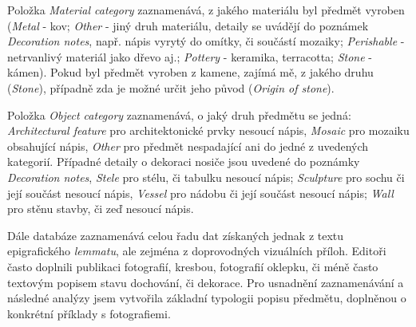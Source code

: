 \startitemize
\item
  \startblockquote
  Položka {\em Material category} zaznamenává, z jakého materiálu byl předmět vyroben ({\em Metal} - kov; {\em Other} - jiný druh materiálu, detaily se uvádějí do poznámek {\em Decoration notes}, např. nápis vyrytý do omítky, či součástí mozaiky; {\em Perishable} - netrvanlivý materiál jako dřevo aj.; {\em Pottery} - keramika, terracotta; {\em Stone} - kámen). Pokud byl předmět vyroben z kamene, zajímá mě, z jakého druhu ({\em Stone}), případně zda je možné určit jeho původ ({\em Origin of stone}).
  \stopblockquote
\item
  \startblockquote
  Položka {\em Object category} zaznamenává, o jaký druh předmětu se jedná: {\em Architectural feature} pro architektonické prvky nesoucí nápis, {\em Mosaic} pro mozaiku obsahující nápis, {\em Other} pro předmět nespadající ani do jedné z uvedených kategorií. Případné detaily o dekoraci nosiče jsou uvedené do poznámky {\em Decoration notes}, {\em Stele} pro stélu, či tabulku nesoucí nápis; {\em Sculpture} pro sochu či její součást nesoucí nápis, {\em Vessel} pro nádobu či její součást nesoucí nápis; {\em Wall} pro stěnu stavby, či zeď nesoucí nápis.
  \stopblockquote
\stopitemize

Dále databáze zaznamenává celou řadu dat získaných jednak z textu epigrafického {\em lemmatu}, ale zejména z doprovodných vizuálních příloh. Editoři často doplnili publikaci fotografií, kresbou, fotografií oklepku, či méně často textovým popisem stavu dochování, či dekorace. Pro usnadnění zaznamenávání a následné analýzy jsem vytvořila základní typologii popisu předmětu, doplněnou o konkrétní příklady s fotografiemi.

